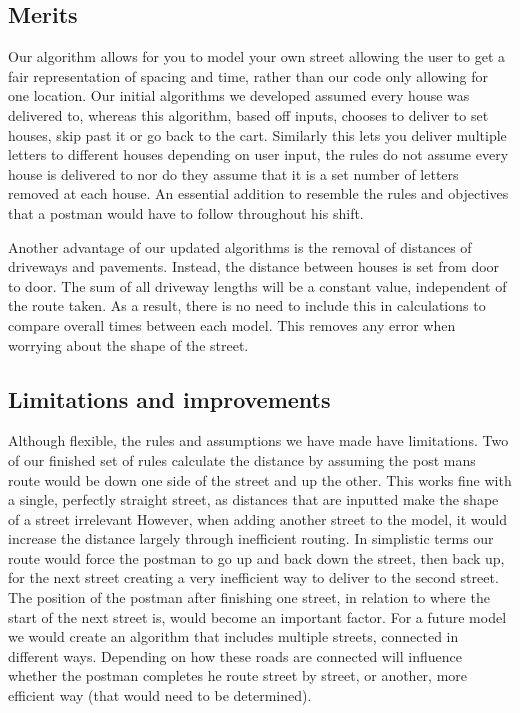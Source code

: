 \documentclass[14pt]{article}
\begin{document}
\subsection{Merits}
Our algorithm allows for you to model your own street allowing the user to get a fair representation of spacing and time, rather than our code only allowing for one location. Our initial algorithms we developed assumed every house was delivered to, whereas this algorithm, based off inputs, chooses to deliver to set houses, skip past it or go back to the cart. Similarly this lets you deliver multiple letters to different houses depending on user input, the rules do not assume every house is delivered to nor do they assume that it is a set number of letters removed at each house. An essential addition to resemble the rules and objectives that a postman would have to follow throughout his shift. 

Another advantage of our updated algorithms is the removal of distances of driveways and pavements. Instead, the distance between houses is set from door to door. The sum of all driveway lengths will be a constant value, independent of the route taken. As a result, there is no need to include this in calculations to compare overall times between each model. This removes any error when worrying about the shape of the street. 

\subsection{Limitations and improvements}
Although flexible, the rules and assumptions we have made have limitations. Two of our finished set of rules calculate the distance by assuming the post mans route would be down one side of the street and up the other. This works fine with a single, perfectly straight street, as distances that are inputted make the shape of a street irrelevant However, when adding another street to the model, it would increase the distance largely through inefficient routing. In simplistic terms our route would force the postman to go up and back down the street, then back up, for the next street creating a very inefficient way to deliver to the second street. The position of the postman after finishing one street, in relation to where the start of the next street is, would become an important factor. 
For a future model we would create an algorithm that includes multiple streets, connected in different ways. Depending on how these roads are connected will influence whether the postman completes he route street by street, or another, more efficient way (that would need to be determined).  
\end{document}
